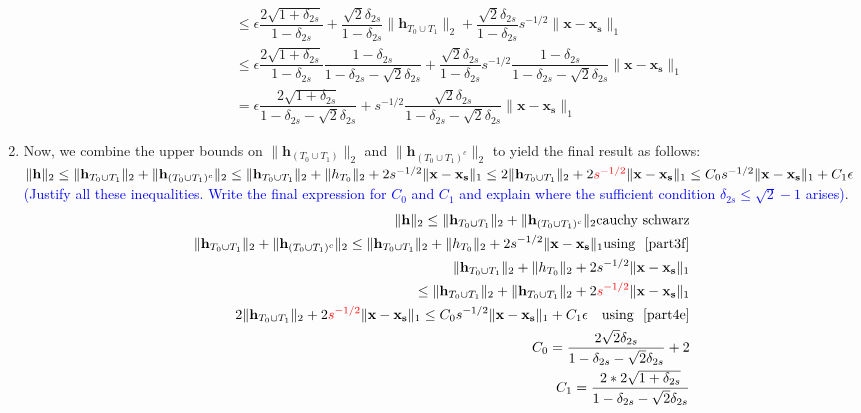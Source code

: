 \documentclass[11pt]{article}
\begin{document}
\begin{enumerate}
\begin{enumerate}
\begin{equation}
\begin{aligned}
\\ & \leq \epsilon \dfrac{2\sqrt{1+\delta_{2s}}}{1-\delta_{2s}} + \dfrac{\sqrt{2}\delta_{2s}}{1-\delta_{2s}} \|\mathbf{h}_{T_0 \cup T_1}\|_2 + \dfrac{\sqrt{2}\delta_{2s}}{1-\delta_{2s}} s^{-1/2} \|\mathbf{x}-\mathbf{x_s}\|_1\\ &\leq \epsilon \dfrac{2\sqrt{1+\delta_{2s}}}{1-\delta_{2s}} \dfrac{1-\delta_{2s}}{1-\delta_{2s} -\sqrt{2}\delta_{2s}} +  \dfrac{\sqrt{2}\delta_{2s}}{1-\delta_{2s}} s^{-1/2}\dfrac{1-\delta_{2s}}{1-\delta_{2s} -\sqrt{2}\delta_{2s}} \|\mathbf{x}-\mathbf{x_s}\|_1\\
&=\epsilon \dfrac{2\sqrt{1+\delta_{2s}}}{1-\delta_{2s} -\sqrt{2}\delta_{2s}} + s^{-1/2} \dfrac{\sqrt{2}\delta_{2s}}{1-\delta_{2s} -\sqrt{2}\delta_{2s}} \|\mathbf{x}-\mathbf{x_s}\|_1
\end{aligned}
\end{equation}
\end{enumerate}
\item Now, we combine the upper bounds on $\|\mathbf{h}_{(T_0 \cup T_1)}\|_2$ and $\|\mathbf{h}_{(T_0 \cup T_1)^c}\|_2$ to yield the final result as follows: \\
$\|\mathbf{h}\|_2 \leq \|\mathbf{h}_{T_0 \cup T_1}\|_2 + \|\mathbf{h}_{(T_0 \cup T_1)^c}\|_2 \leq \|\mathbf{h}_{T_0 \cup T_1}\|_2 + \|h_{T_0}\|_2 + 2s^{-1/2}\|\mathbf{x}-\mathbf{x_s}\|_1 \\
\leq 2 \|\mathbf{h}_{T_0 \cup T_1}\|_2 + 2\textcolor{red}{s^{-1/2}}\|\mathbf{x}-\mathbf{x_s}\|_1 \leq C_0 s^{-1/2} \|\mathbf{x}-\mathbf{x_s}\|_1 + C_1 \epsilon$ \textcolor{blue}{(Justify all these inequalities. Write the final expression for $C_0$ and $C_1$ and explain where the sufficient condition $\delta_{2s} \leq \sqrt{2}-1$ arises)}.
\begin{eqnarray}
\|\mathbf{h}\|_2 \leq \|\mathbf{h}_{T_0 \cup T_1}\|_2 + \|\mathbf{h}_{(T_0 \cup T_1)^c}\|_2 \text{cauchy  schwarz}\\
\|\mathbf{h}_{T_0 \cup T_1}\|_2 + \|\mathbf{h}_{(T_0 \cup T_1)^c}\|_2 \leq \|\mathbf{h}_{T_0 \cup T_1}\|_2 + \|h_{T_0}\|_2 + 2s^{-1/2}\|\mathbf{x}-\mathbf{x_s}\|_1 \text {using ~\ref{part3f}}\\
\|\mathbf{h}_{T_0 \cup T_1}\|_2 + \|h_{T_0}\|_2 + 2s^{-1/2}\|\mathbf{x}-\mathbf{x_s}\|_1 \\
\leq  \|\mathbf{h}_{T_0 \cup T_1}\|_2+ \|\mathbf{h}_{T_0 \cup T_1}\|_2 + 2\textcolor{red}{s^{-1/2}}\|\mathbf{x}-\mathbf{x_s}\|_1\\ 
2 \|\mathbf{h}_{T_0 \cup T_1}\|_2 + 2\textcolor{red}{s^{-1/2}}\|\mathbf{x}-\mathbf{x_s}\|_1 \leq C_0 s^{-1/2} \|\mathbf{x}-\mathbf{x_s}\|_1 + C_1 \epsilon \quad \text{using ~\ref{part4e}}\\
C_{0} = \dfrac{2\sqrt{2}\delta_{2s}}{1-\delta_{2s} -\sqrt{2}\delta_{2s}} + 2\\
C_{1} = \dfrac{2*2\sqrt{1+\delta_{2s}}}{1-\delta_{2s} -\sqrt{2}\delta_{2s}}
\end{eqnarray}
\end{enumerate}
\end{document}
